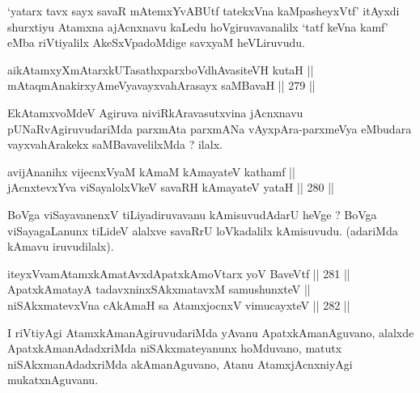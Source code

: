 \begin{artha}
`yatarx tavx sayx savaR mAtemxYvABUtf tatekxVna kaMpasheyxVtf' itAyxdi shurxtiyu Atamxna ajAcnxnavu kaLedu hoVgiruvavanalilx
`tatf keVna kamf' eMba riVtiyalilx AkeSxVpadoMdige savxyaM heVLiruvudu.
\end{artha}


\begin{shl}
aikAtamxyXmAtarxkUTasathxparxboVdhAvasiteVH kutaH || \\
mAtaqmAnakirxyAmeVyavayxvahArasayx saMBavaH \hfill || 279 ||  
\end{shl}

\begin{artha}
EkAtamxvoMdeV Agiruva niviRkAravasutxvina jAcnxnavu
pUNaRvAgiruvudariMda parxmAta parxmANa vAyxpAra-parxmeVya eMbudara
vayxvahArakekx saMBavavelilxMda ? ilalx.
\end{artha}


\begin{shl}
avijAnanihx vijecnxVyaM kAmaM kAmayateV kathamf || \\
jAcnxtevxYva viSayalolxVkeV savaRH kAmayateV yataH \hfill || 280 ||  
\end{shl}

\begin{artha}
BoVga viSayavanenxV tiLiyadiruvavanu kAmisuvudAdarU heVge ? BoVga
viSayagaLanunx tiLideV alalxve savaRrU loVkadalilx kAmisuvudu.
(adariMda kAmavu iruvudilalx).
\end{artha}

\begin{shl}
iteyxVvamAtamxkAmatAvxdApatxkAmoV\s tarx yoV BaveVtf \hfill || 281 ||  \\
ApatxkAmatayA tadavxninxSAkxmatavxM samushunxteV || \\
niSAkxmatevxVna cAkAmaH sa AtamxjocnxV vimucayxteV \hfill || 282 ||  
\end{shl}

\begin{artha}
I riVtiyAgi AtamxkAmanAgiruvudariMda yAvanu ApatxkAmanAguvano, alalxde
ApatxkAmanAdadxriMda niSAkxmateyanunx hoMduvano, matutx
niSAkxmanAdadxriMda akAmanAguvano, Atanu AtamxjAcnxniyAgi
mukatxnAguvanu.
\end{artha}


